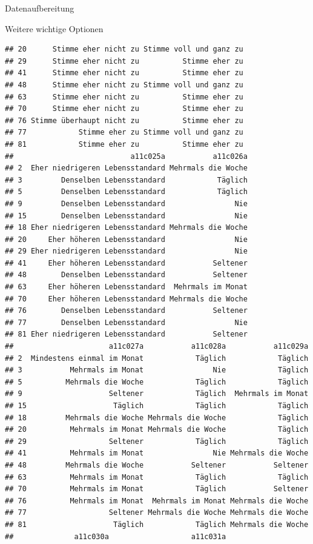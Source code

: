 \documentclass[ignorenonframetext,]{beamer}
\begin{document}
\begin{frame}[fragile]{Datenaufbereitung}
\begin{block}{Weitere wichtige Optionen}
\begin{verbatim}
## 20      Stimme eher nicht zu Stimme voll und ganz zu
## 29      Stimme eher nicht zu          Stimme eher zu
## 41      Stimme eher nicht zu          Stimme eher zu
## 48      Stimme eher nicht zu Stimme voll und ganz zu
## 63      Stimme eher nicht zu          Stimme eher zu
## 70      Stimme eher nicht zu          Stimme eher zu
## 76 Stimme überhaupt nicht zu          Stimme eher zu
## 77            Stimme eher zu Stimme voll und ganz zu
## 81            Stimme eher zu          Stimme eher zu
##                           a11c025a           a11c026a
## 2  Eher niedrigeren Lebensstandard Mehrmals die Woche
## 3         Denselben Lebensstandard            Täglich
## 5         Denselben Lebensstandard            Täglich
## 9         Denselben Lebensstandard                Nie
## 15        Denselben Lebensstandard                Nie
## 18 Eher niedrigeren Lebensstandard Mehrmals die Woche
## 20     Eher höheren Lebensstandard                Nie
## 29 Eher niedrigeren Lebensstandard                Nie
## 41     Eher höheren Lebensstandard           Seltener
## 48        Denselben Lebensstandard           Seltener
## 63     Eher höheren Lebensstandard  Mehrmals im Monat
## 70     Eher höheren Lebensstandard Mehrmals die Woche
## 76        Denselben Lebensstandard           Seltener
## 77        Denselben Lebensstandard                Nie
## 81 Eher niedrigeren Lebensstandard           Seltener
##                      a11c027a           a11c028a           a11c029a
## 2  Mindestens einmal im Monat            Täglich            Täglich
## 3           Mehrmals im Monat                Nie            Täglich
## 5          Mehrmals die Woche            Täglich            Täglich
## 9                    Seltener            Täglich  Mehrmals im Monat
## 15                    Täglich            Täglich            Täglich
## 18         Mehrmals die Woche Mehrmals die Woche            Täglich
## 20          Mehrmals im Monat Mehrmals die Woche            Täglich
## 29                   Seltener            Täglich            Täglich
## 41          Mehrmals im Monat                Nie Mehrmals die Woche
## 48         Mehrmals die Woche           Seltener           Seltener
## 63          Mehrmals im Monat            Täglich            Täglich
## 70          Mehrmals im Monat            Täglich           Seltener
## 76          Mehrmals im Monat  Mehrmals im Monat Mehrmals die Woche
## 77                   Seltener Mehrmals die Woche Mehrmals die Woche
## 81                    Täglich            Täglich Mehrmals die Woche
##              a11c030a                   a11c031a

\end{verbatim}
\end{block}
\end{frame}
\end{document}
